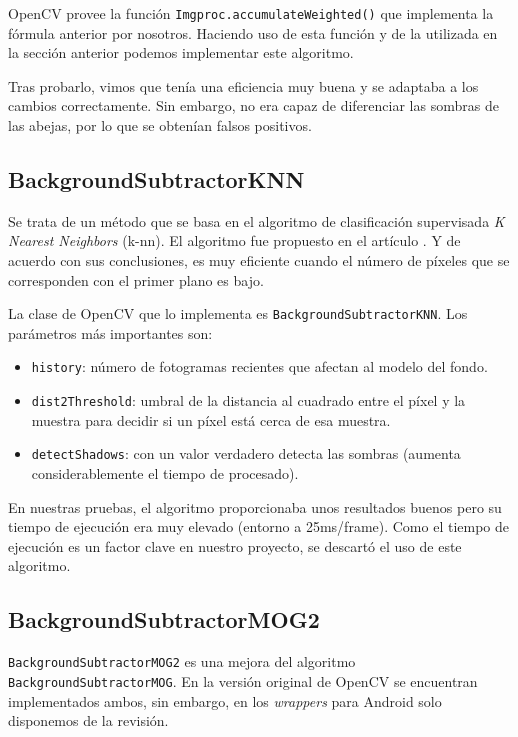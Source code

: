 OpenCV provee la función \texttt{Imgproc.accumulateWeighted()} que
implementa la fórmula anterior por nosotros. Haciendo uso de esta
función y de la utilizada en la sección anterior podemos implementar
este algoritmo.

Tras probarlo, vimos que tenía una eficiencia muy buena y se adaptaba a
los cambios correctamente. Sin embargo, no era capaz de diferenciar las
sombras de las abejas, por lo que se obtenían falsos positivos.

\subsection{BackgroundSubtractorKNN}\label{backgroundsubtractorknn}

Se trata de un método que se basa en el algoritmo de clasificación
supervisada \emph{K Nearest Neighbors} (k-nn). El algoritmo fue
propuesto en el artículo \citep{art:zivkovic_efficient_2006}. Y de
acuerdo con sus conclusiones, es muy eficiente cuando el número de
píxeles que se corresponden con el primer plano es bajo.

La clase de OpenCV que lo implementa es
\texttt{BackgroundSubtractorKNN}. Los parámetros más importantes son:

\begin{itemize}
\tightlist
\item
  \texttt{history}: número de fotogramas recientes que afectan al modelo
  del fondo.
\item
  \texttt{dist2Threshold}: umbral de la distancia al cuadrado entre el
  píxel y la muestra para decidir si un píxel está cerca de esa muestra.
\item
  \texttt{detectShadows}: con un valor verdadero detecta las sombras
  (aumenta considerablemente el tiempo de procesado).
\end{itemize}

En nuestras pruebas, el algoritmo proporcionaba unos resultados buenos
pero su tiempo de ejecución era muy elevado (entorno a 25ms/frame). Como
el tiempo de ejecución es un factor clave en nuestro proyecto, se
descartó el uso de este algoritmo.

\subsection{BackgroundSubtractorMOG2}\label{backgroundsubtractormog2}

\texttt{BackgroundSubtractorMOG2} es una mejora del algoritmo
\\ \texttt{BackgroundSubtractorMOG}. En la versión original de OpenCV se
encuentran implementados ambos, sin embargo, en los \emph{wrappers} para
Android solo disponemos de la revisión.

